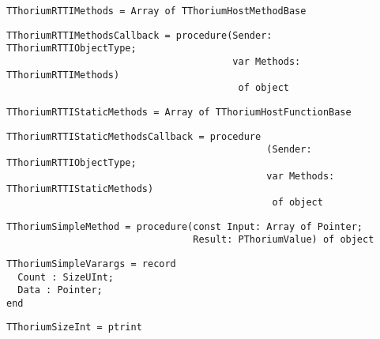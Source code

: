 \begin{verbatim}
TThoriumRTTIMethods = Array of TThoriumHostMethodBase
\end{verbatim}
\label{thoriumcore:thorium:tthoriumrttimethods}



\begin{verbatim}
TThoriumRTTIMethodsCallback = procedure(Sender: TThoriumRTTIObjectType;
                                        var Methods: TThoriumRTTIMethods)
                                         of object
\end{verbatim}
\label{thoriumcore:thorium:tthoriumrttimethodscallback}



\begin{verbatim}
TThoriumRTTIStaticMethods = Array of TThoriumHostFunctionBase
\end{verbatim}
\label{thoriumcore:thorium:tthoriumrttistaticmethods}



\begin{verbatim}
TThoriumRTTIStaticMethodsCallback = procedure
                                              (Sender: TThoriumRTTIObjectType;
                                              var Methods: TThoriumRTTIStaticMethods)
                                               of object
\end{verbatim}
\label{thoriumcore:thorium:tthoriumrttistaticmethodscallback}



\begin{verbatim}
TThoriumSimpleMethod = procedure(const Input: Array of Pointer;
                                 Result: PThoriumValue) of object
\end{verbatim}
\label{thoriumcore:thorium:tthoriumsimplemethod}



\begin{verbatim}
TThoriumSimpleVarargs = record
  Count : SizeUInt;
  Data : Pointer;
end

\end{verbatim}
\label{thoriumcore:thorium:tthoriumsimplevarargs}



\begin{verbatim}
TThoriumSizeInt = ptrint
\end{verbatim}
\label{thoriumcore:thorium:tthoriumsizeint}



